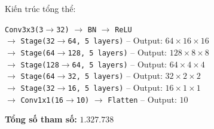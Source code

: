 \documentclass[a4paper]{article}
\theoremstyle{definition}
\begin{document}
Kiến trúc tổng thể:
\begin{center}
\small
\texttt{Conv3x3(3$\to$32)} $\to$ \texttt{BN} $\to$ \texttt{ReLU} \\
$\to$ \texttt{Stage(32$\to$64, 5 layers)} -- Output: $64 \times 16 \times 16$ \\
$\to$ \texttt{Stage(64$\to$128, 5 layers)} -- Output: $128 \times 8 \times 8$ \\
$\to$ \texttt{Stage(128$\to$64, 5 layers)} -- Output: $64 \times 4 \times 4$ \\
$\to$ \texttt{Stage(64$\to$32, 5 layers)} -- Output: $32 \times 2 \times 2$ \\
$\to$ \texttt{Stage(32$\to$16, 5 layers)} -- Output: $16 \times 1 \times 1$ \\
$\to$ \texttt{Conv1x1(16$\to$10)} $\to$ \texttt{Flatten} -- Output: $10$
\end{center}

\textbf{Tổng số tham số:} $\mathbf{1.327.738}$
\end{document}
